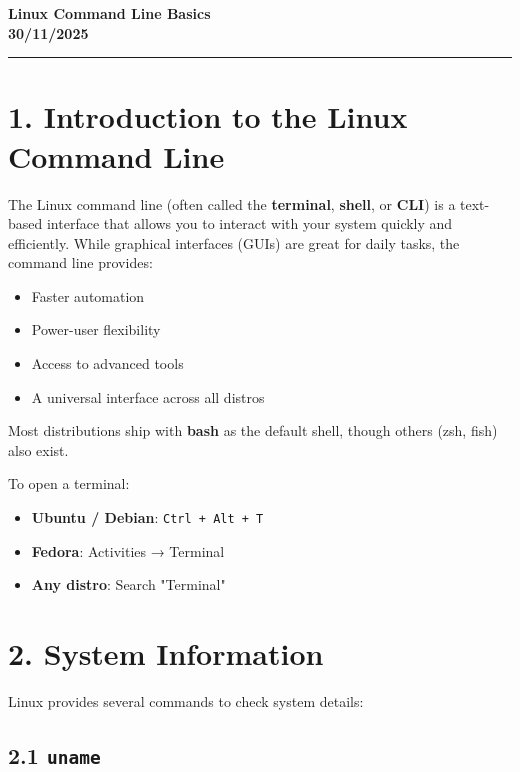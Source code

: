 \documentclass[12pt]{article}
\newcommand{\courseTitle}{Linux Command Line Basics}
\newcommand{\courseDate}{30/11/2025}
\begin{document}
\begin{center}
\headingfont\Huge\bfseries\color{navy}
\courseTitle\\[0.5em]
\Large\color{teamred}
\courseDate
\end{center}

\vspace{1em}
\begin{center}
\color{teamred}\rule{0.8\textwidth}{1pt}
\end{center}

\section*{1. Introduction to the Linux Command Line}

The Linux command line (often called the \textbf{terminal}, \textbf{shell}, or \textbf{CLI}) is a text-based interface that allows you to interact with your system quickly and efficiently. While graphical interfaces (GUIs) are great for daily tasks, the command line provides:

\begin{itemize}
    \item Faster automation
    \item Power-user flexibility
    \item Access to advanced tools
    \item A universal interface across all distros
\end{itemize}

Most distributions ship with \textbf{bash} as the default shell, though others (zsh, fish) also exist.

To open a terminal:

\begin{itemize}
    \item \textbf{Ubuntu / Debian}: \texttt{Ctrl + Alt + T}
    \item \textbf{Fedora}: Activities → Terminal
    \item \textbf{Any distro}: Search "Terminal"
\end{itemize}

\section*{2. System Information}

Linux provides several commands to check system details:

\subsection*{2.1 \texttt{uname}}
\end{document}
